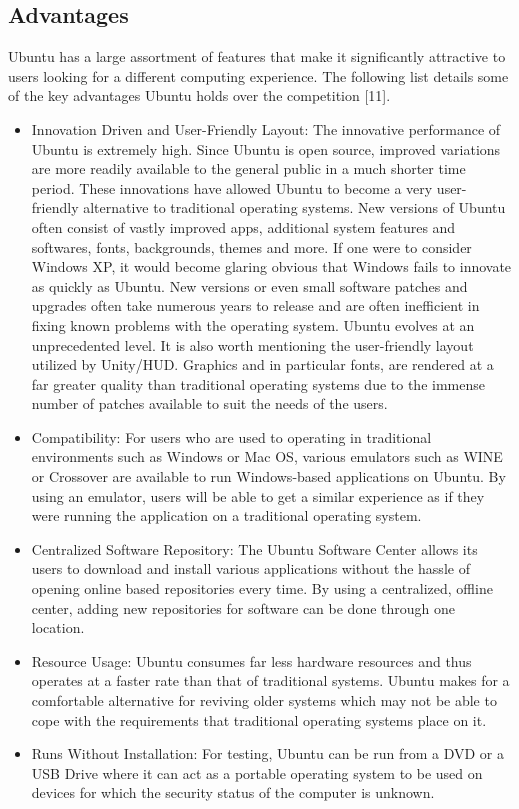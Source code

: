 \documentclass[11pt]{article}
\newcommand{\forceindent}{\leavevmode{\parindent=1em\indent}}
\begin{document}
\subsection{Advantages}
\forceindent Ubuntu has a large assortment of features that make it significantly attractive to users looking for a different computing experience. The following list details some of the key advantages Ubuntu holds over the competition [11].
\begin{itemize}
\item Innovation Driven and User-Friendly Layout: The innovative performance of Ubuntu is extremely high. Since Ubuntu is open source, improved variations are more readily available to the general public in a much shorter time period. These innovations have allowed Ubuntu to become a very user-friendly alternative to traditional operating systems. New versions of Ubuntu often consist of vastly improved apps, additional system features and softwares, fonts, backgrounds, themes and more. If one were to consider Windows XP, it would become glaring obvious that Windows fails to innovate as quickly as Ubuntu. New versions or even small software patches and upgrades often take numerous years to release and are often inefficient in fixing known problems with the operating system. Ubuntu evolves at an unprecedented level. It is also worth mentioning the user-friendly layout utilized by Unity/HUD. Graphics and in particular fonts, are rendered at a far greater quality than traditional operating systems due to the immense number of patches available to suit the needs of the users.
\item Compatibility: For users who are used to operating in traditional environments such as Windows or Mac OS, various emulators such as WINE or Crossover are available to run Windows-based applications on Ubuntu. By using an emulator, users will be able to get a similar experience as if they were running the application on a traditional operating system.
\item Centralized Software Repository: The Ubuntu Software Center allows its users to download and install various applications without the hassle of opening online based repositories every time. By using a centralized, offline center, adding new repositories for software can be done through one location.
\item Resource Usage: Ubuntu consumes far less hardware resources and thus operates at a faster rate than that of traditional systems. Ubuntu makes for a comfortable alternative for reviving older systems which may not be able to cope with the requirements that traditional operating systems place on it.
\item Runs Without Installation: For testing, Ubuntu can be run from a DVD or a USB Drive where it can act as a portable operating system to be used on devices for which the security status of the computer is unknown. 

\end{itemize}
\end{document}
